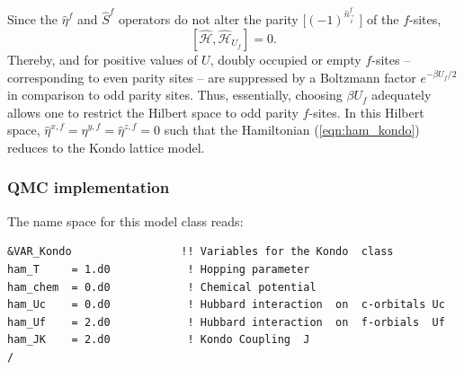  Since the $\hat{\eta}^{f}$ and $ \hat{S}^{f}$ operators  do not alter the  parity [$(-1)^{\hat{n}^{f}_{\vec{i}}}$ ] of the $f$-sites, 
 \begin{equation}
 	\left[  \hat{\mathcal{H}}, \hat{\mathcal{H}}_{U_f} \right] = 0.
 \end{equation}
 Thereby, and for positive values of $U$,  doubly occupied  or empty $f$-sites -- corresponding to even parity sites -- are suppressed  by a  Boltzmann factor 
 $e^{-\beta U_f/2} $ in comparison to odd parity sites.  Thus, essentially, choosing $\beta U_f $ adequately allows one to restrict the Hilbert space to odd parity $f$-sites.  
 In this Hilbert space, $\hat{\eta}^{x,f} = \hat{\eta}^{y,f} =  \hat{\eta}^{z,f} =0$  such that the Hamiltonian (\ref{eqn:ham_kondo}) reduces to the Kondo lattice model. 


\subsubsection*{QMC implementation} 

The name space for this model class  reads: 

\begin{lstlisting}[style=fortran,escapechar=\#,breaklines=true]
&VAR_Kondo                 !! Variables for the Kondo  class
ham_T     = 1.d0            ! Hopping parameter
ham_chem  = 0.d0            ! Chemical potential
ham_Uc    = 0.d0            ! Hubbard interaction  on  c-orbitals Uc
ham_Uf    = 2.d0            ! Hubbard interaction  on  f-orbials  Uf
ham_JK    = 2.d0            ! Kondo Coupling  J
/
\end{lstlisting}

